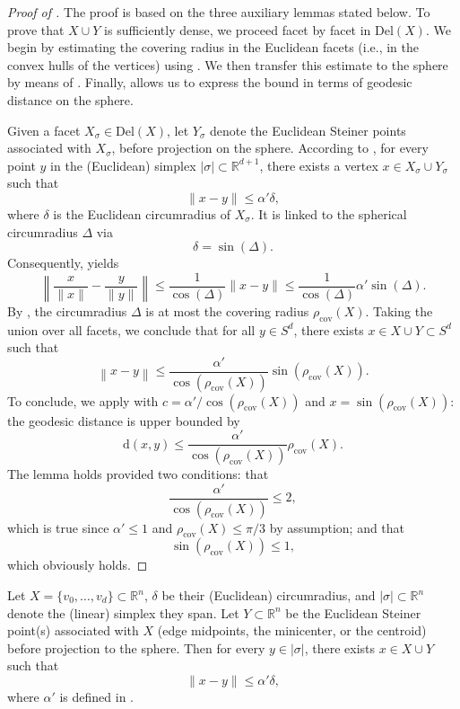 \documentclass[a4paper,english,cleveref,autoref,thm-restate,nolineno]{socg-lipics-v2021}
\newcommand{\R}{\mathbb R}
\renewcommand{\d} { \mathrm{d} } %
\newcommand{\geomreal}[1] { |#1| } %
\newcommand{\Del}[1] { \mathrm{Del}(#1) } %
\begin{document}
\begin{proof}[Proof of ]
	\label{proof:decreasecoveringradius}
	The proof is based on the three auxiliary lemmas stated below.
	To prove that $X\cup Y$ is sufficiently dense, we proceed facet by facet in $\Del{X}$.
	We begin by estimating the covering radius in the Euclidean facets (i.e., in the convex hulls of the vertices) using .
	We then transfer this estimate to the sphere by means of .
	Finally,  allows us to express the bound in terms of geodesic distance on the sphere.
	
	Given a facet $X_\sigma\in\Del{X}$, let $Y_\sigma$ denote the Euclidean Steiner points associated with $X_\sigma$, before projection on the sphere.
	According to , for every point $y$ in the (Euclidean) simplex $\geomreal{\sigma}\subset\R^{d+1}$, there exists a vertex $x\in X_\sigma\cup Y_\sigma$ such that
	\[
	\|x-y\| \leq \alpha' \delta,
	\]
	where $\delta$ is the Euclidean circumradius of $X_\sigma$.
	It is linked to the spherical circumradius $\Delta$ via
	\[
	\delta = \sin(\Delta).
	\]
	Consequently,  yields
	\[
	\left\|\frac{x}{\|x\|}-\frac{y}{\|y\|} \right\|
	\leq
	\frac{1}{\cos(\Delta)} \|x-y\|
	\leq
	\frac{1}{\cos(\Delta)} \alpha'\sin(\Delta).
	\]
	By , the circumradius $\Delta$ is at most the covering radius $\rho_\mathrm{cov}(X)$.
	Taking the union over all facets, we conclude that for all $y\in S^d$, there exists $x\in X\cup Y\subset S^d$ such that
	\[
	\left\| x-y\right\|
	\leq
	\frac{\alpha'}{\cos(\rho_\mathrm{cov}(X))} \sin(\rho_\mathrm{cov}(X)).
	\]
	To conclude, we apply  with $c=\alpha'/\cos(\rho_\mathrm{cov}(X))$ and $x=\sin(\rho_\mathrm{cov}(X))$: the geodesic distance is upper bounded by
	\[
	\d(x,y)
	\leq
	\frac{\alpha'}{\cos(\rho_\mathrm{cov}(X))} \rho_\mathrm{cov}(X).
	\]
	The lemma holds provided two conditions: that 
	\[
	\frac{\alpha'}{\cos(\rho_\mathrm{cov}(X))}\leq2,
	\] 
	which is true since $\alpha'\leq 1$ and $\rho_\mathrm{cov}(X)\leq \pi/3$ by assumption; and that 
	\[
	\sin(\rho_\mathrm{cov}(X))\leq1,
	\]
	which obviously holds.
\end{proof}

\begin{lemma}\label{lem:steiner_covering}
	Let $X=\{v_0,\dots,v_{d}\}\subset\R^{n}$, $\delta$ be their (Euclidean) circumradius, and $\geomreal{\sigma}\subset \R^{n}$ denote the (linear) simplex they span.
	Let $Y\subset\R^{n}$ be the Euclidean Steiner point(s) associated with $X$ (edge midpoints, the minicenter, or the centroid) before projection to the sphere.
	Then for every $y \in \geomreal{\sigma}$, there exists $x\in X\cup Y$ such that
	\[
	\|x-y\| \leq \alpha' \delta,
	\]
	where $\alpha'$ is defined in .	
\end{lemma}
\end{document}
